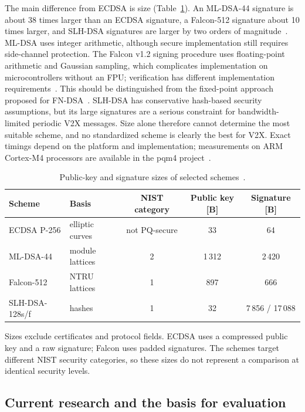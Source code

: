 \documentclass[11pt,a4paper]{article}
\begin{document}
The main difference from ECDSA is size (Table~\ref{tab:schemes}). An ML-DSA-44 signature is
about 38 times larger than an ECDSA signature, a Falcon-512 signature about 10 times larger,
and SLH-DSA signatures are larger by two orders of magnitude~\cite{falcon,fips204,fips205}.
ML-DSA uses integer arithmetic, although secure implementation still requires side-channel
protection. The Falcon v1.2 signing procedure uses floating-point arithmetic and Gaussian
sampling, which complicates implementation on microcontrollers without an FPU; verification has
different implementation requirements~\cite{falcon}. This should be distinguished from the
fixed-point approach proposed for FN-DSA~\cite{perlner}. SLH-DSA has conservative hash-based
security assumptions, but its large signatures are a serious constraint for bandwidth-limited
periodic V2X messages. Size alone therefore cannot determine the most suitable scheme, and no
standardized scheme is clearly the best for V2X. Exact timings depend on the platform and
implementation; measurements on ARM Cortex-M4 processors are available in the pqm4
project~\cite{pqm4}.

\begin{table}[htbp]
\centering
\caption{Public-key and signature sizes of selected schemes~\cite{etsi097r2,falcon,fips204,fips205}.}
\label{tab:schemes}
\begin{tabular}{@{}llccc@{}}
\toprule
Scheme & Basis & NIST category & Public key [B] & Signature [B] \\
\midrule
ECDSA P-256     & elliptic curves & not PQ-secure & 33    & 64 \\
ML-DSA-44       & module lattices & 2             & 1\,312 & 2\,420 \\
Falcon-512      & NTRU lattices   & 1             & 897   & 666 \\
SLH-DSA-128s/f  & hashes          & 1             & 32    & 7\,856 / 17\,088 \\
\bottomrule
\end{tabular}

\medskip
\parbox{0.92\textwidth}{\small
Sizes exclude certificates and protocol fields. ECDSA uses a compressed public key and
a raw signature; Falcon uses padded signatures. The schemes target different NIST security
categories, so these sizes do not represent a comparison at identical security levels.}
\end{table}

\subsection{Current research and the basis for evaluation}
\end{document}
